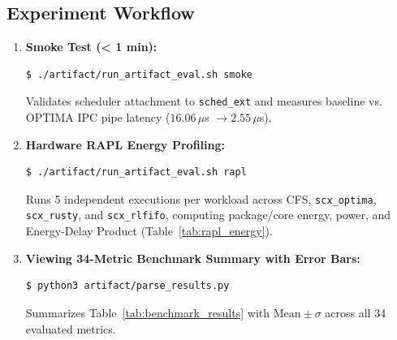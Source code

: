 \documentclass[conference]{IEEEtran}
\begin{document}
\subsection{Experiment Workflow}
\begin{enumerate}
    \item \textbf{Smoke Test (< 1 min):}
    \begin{verbatim}
$ ./artifact/run_artifact_eval.sh smoke
    \end{verbatim}
    Validates scheduler attachment to \texttt{sched\_ext} and measures baseline vs. OPTIMA IPC pipe latency ($16.06\,\mu$s $\to 2.55\,\mu$s).
    \item \textbf{Hardware RAPL Energy Profiling:}
    \begin{verbatim}
$ ./artifact/run_artifact_eval.sh rapl
    \end{verbatim}
    Runs 5 independent executions per workload across CFS, \texttt{scx\_optima}, \texttt{scx\_rusty}, and \texttt{scx\_rlfifo}, computing package/core energy, power, and Energy-Delay Product (Table~\ref{tab:rapl_energy}).
    \item \textbf{Viewing 34-Metric Benchmark Summary with Error Bars:}
    \begin{verbatim}
$ python3 artifact/parse_results.py
    \end{verbatim}
    Summarizes Table~\ref{tab:benchmark_results} with $\text{Mean} \pm \sigma$ across all 34 evaluated metrics.
\end{enumerate}
\end{document}
